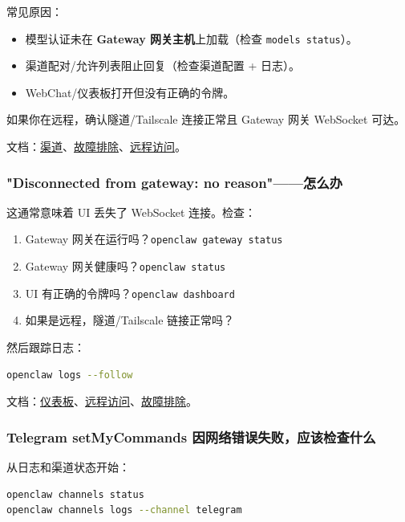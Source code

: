 常见原因：

\begin{itemize}
  \item 模型认证未在 \textbf{Gateway 网关主机}上加载（检查 \texttt{models status}）。
  \item 渠道配对/允许列表阻止回复（检查渠道配置 + 日志）。
  \item WebChat/仪表板打开但没有正确的令牌。
\end{itemize}


如果你在远程，确认隧道/Tailscale 连接正常且 Gateway 网关 WebSocket 可达。

文档：\href{/channels}{渠道}、\href{/gateway/troubleshooting}{故障排除}、\href{/gateway/remote}{远程访问}。

\subsubsection{"Disconnected from gateway: no reason"——怎么办}


这通常意味着 UI 丢失了 WebSocket 连接。检查：

\begin{enumerate}
  \item Gateway 网关在运行吗？\texttt{openclaw gateway status}
  \item Gateway 网关健康吗？\texttt{openclaw status}
  \item UI 有正确的令牌吗？\texttt{openclaw dashboard}
  \item 如果是远程，隧道/Tailscale 链接正常吗？
\end{enumerate}


然后跟踪日志：

\begin{lstlisting}[language=bash]
openclaw logs --follow
\end{lstlisting}


文档：\href{/web/dashboard}{仪表板}、\href{/gateway/remote}{远程访问}、\href{/gateway/troubleshooting}{故障排除}。

\subsubsection{Telegram setMyCommands 因网络错误失败，应该检查什么}


从日志和渠道状态开始：

\begin{lstlisting}[language=bash]
openclaw channels status
openclaw channels logs --channel telegram
\end{lstlisting}


